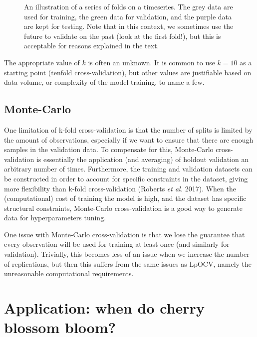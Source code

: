 \documentclass[
  letterpaper,
]{scrbook}
\begin{document}
\begin{figure}[pbt]
{}

\caption{\label{fig-splits-illustration}An illustration of a series of
folds on a timeseries. The grey data are used for training, the green
data for validation, and the purple data are kept for testing. Note that
in this context, we sometimes use the future to validate on the past
(look at the first fold!), but this is acceptable for reasons explained
in the text.}

\end{figure}%

The appropriate value of \(k\) is often an unknown. It is common to use
\(k = 10\) as a starting point (tenfold cross-validation), but other
values are justifiable based on data volume, or complexity of the model
training, to name a few.

\subsection{Monte-Carlo}\label{sec-crossvalidation-montecarlo}

One limitation of k-fold cross-validation is that the number of splits
is limited by the amount of observations, especially if we want to
ensure that there are enough samples in the validation data. To
compensate for this, Monte-Carlo cross-validation is essentially the
application (and averaging) of holdout validation an arbitrary number of
times. Furthermore, the training and validation datasets can be
constructed in order to account for specific constraints in the dataset,
giving more flexibility than k-fold cross-validation (Roberts \emph{et
al.} 2017). When the (computational) cost of training the model is high,
and the dataset has specific structural constraints, Monte-Carlo
cross-validation is a good way to generate data for hyperparameters
tuning.

One issue with Monte-Carlo cross-validation is that we lose the
guarantee that every observation will be used for training at least once
(and similarly for validation). Trivially, this becomes less of an issue
when we increase the number of replications, but then this suffers from
the same issues as LpOCV, namely the unreasonable computational
requirements.

\section{Application: when do cherry blossom
bloom?}\label{application-when-do-cherry-blossom-bloom}
\end{document}
